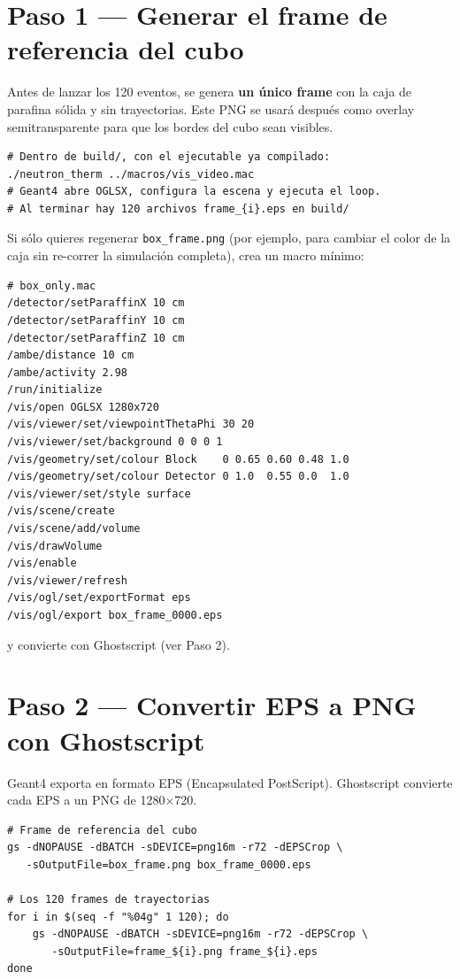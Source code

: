 \documentclass[11pt,a4paper]{article}
\begin{document}
\section{Paso 1 — Generar el frame de referencia del cubo}

Antes de lanzar los 120 eventos, se genera \textbf{un único frame} con la
caja de parafina sólida y sin trayectorias. Este PNG se usará después como
overlay semitransparente para que los bordes del cubo sean visibles.

\begin{lstlisting}[style=console, caption={Generar box\_frame.png desde build/}]
# Dentro de build/, con el ejecutable ya compilado:
./neutron_therm ../macros/vis_video.mac
# Geant4 abre OGLSX, configura la escena y ejecuta el loop.
# Al terminar hay 120 archivos frame_{i}.eps en build/
\end{lstlisting}

\begin{tip}
  Si sólo quieres regenerar \texttt{box\_frame.png} (por ejemplo, para cambiar
  el color de la caja sin re-correr la simulación completa), crea un macro
  mínimo:
\begin{lstlisting}[style=macro]
# box_only.mac
/detector/setParaffinX 10 cm
/detector/setParaffinY 10 cm
/detector/setParaffinZ 10 cm
/ambe/distance 10 cm
/ambe/activity 2.98
/run/initialize
/vis/open OGLSX 1280x720
/vis/viewer/set/viewpointThetaPhi 30 20
/vis/viewer/set/background 0 0 0 1
/vis/geometry/set/colour Block    0 0.65 0.60 0.48 1.0
/vis/geometry/set/colour Detector 0 1.0  0.55 0.0  1.0
/vis/viewer/set/style surface
/vis/scene/create
/vis/scene/add/volume
/vis/drawVolume
/vis/enable
/vis/viewer/refresh
/vis/ogl/set/exportFormat eps
/vis/ogl/export box_frame_0000.eps
\end{lstlisting}
y convierte con Ghostscript (ver Paso 2).
\end{tip}

\section{Paso 2 — Convertir EPS a PNG con Ghostscript}

Geant4 exporta en formato EPS (Encapsulated PostScript).
Ghostscript convierte cada EPS a un PNG de 1280$\times$720.

\begin{lstlisting}[style=console, caption={Conversión por lotes — desde build/}]
# Frame de referencia del cubo
gs -dNOPAUSE -dBATCH -sDEVICE=png16m -r72 -dEPSCrop \
   -sOutputFile=box_frame.png box_frame_0000.eps

# Los 120 frames de trayectorias
for i in $(seq -f "%04g" 1 120); do
    gs -dNOPAUSE -dBATCH -sDEVICE=png16m -r72 -dEPSCrop \
       -sOutputFile=frame_${i}.png frame_${i}.eps
done
\end{lstlisting}
\end{document}
